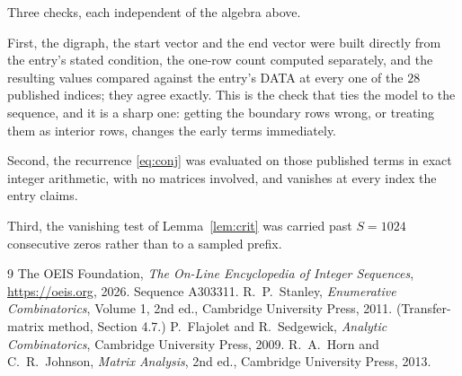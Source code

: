 \documentclass[11pt,a4paper]{article}
\theoremstyle{plain}
\theoremstyle{definition}
\begin{document}
Three checks, each independent of the algebra above.

First, the digraph, the start vector and the end vector were built directly from the
entry's stated condition, the one-row count computed separately, and the resulting values
compared against the entry's DATA at every one of the $28$ published indices; they
agree exactly. This is the check that ties the model to the sequence, and it is a sharp one:
getting the boundary rows wrong, or treating them as interior rows, changes the early terms
immediately.

Second, the recurrence \eqref{eq:conj} was evaluated on those published terms in exact
integer arithmetic, with no matrices involved, and vanishes at every index the entry claims.

Third, the vanishing test of Lemma~\ref{lem:crit} was carried past $S=1024$ consecutive
zeros rather than to a sampled prefix.

\begin{thebibliography}{9}
 The OEIS Foundation, \emph{The On-Line Encyclopedia of Integer
Sequences}, \url{https://oeis.org}, 2026. Sequence A303311.
 R.~P.~Stanley, \emph{Enumerative Combinatorics}, Volume 1, 2nd ed.,
Cambridge University Press, 2011. (Transfer-matrix method, Section 4.7.)
 P.~Flajolet and R.~Sedgewick, \emph{Analytic Combinatorics}, Cambridge
University Press, 2009.
 R.~A.~Horn and C.~R.~Johnson, \emph{Matrix Analysis}, 2nd ed., Cambridge
University Press, 2013.
\end{thebibliography}
\end{document}

